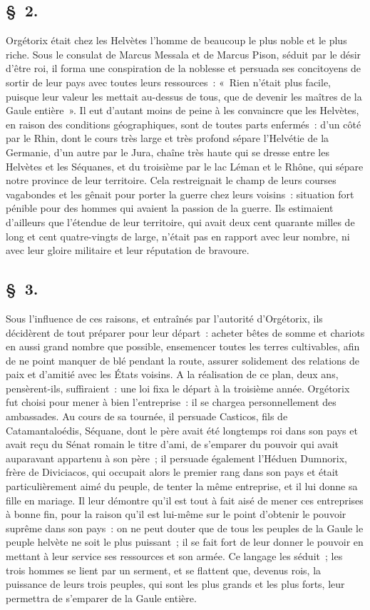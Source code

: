 \documentclass[french,twoside]{book} %
\begin{document}
\subsection[{§ 2.}]{ \textsc{§ 2.} }
\noindent Orgétorix était chez les Helvètes l’homme de beaucoup le plus noble et le plus riche. Sous le consulat de Marcus Messala et de Marcus Pison, séduit par le désir d’être roi, il forma une conspiration de la noblesse et persuada ses concitoyens de sortir de leur pays avec toutes leurs ressources : « Rien n’était plus facile, puisque leur valeur les mettait au-dessus de tous, que de devenir les maîtres de la Gaule entière ». Il eut d’autant moins de peine à les convaincre que les Helvètes, en raison des conditions géographiques, sont de toutes parts enfermés : d’un côté par le Rhin, dont le cours très large et très profond sépare l’Helvétie de la Germanie, d’un autre par le Jura, chaîne très haute qui se dresse entre les Helvètes et les Séquanes, et du troisième par le lac Léman et le Rhône, qui sépare notre province de leur territoire. Cela restreignait le champ de leurs courses vagabondes et les gênait pour porter la guerre chez leurs voisins : situation fort pénible pour des hommes qui avaient la passion de la guerre. Ils estimaient d’ailleurs que l’étendue de leur territoire, qui avait deux cent quarante milles de long et cent quatre-vingts de large, n’était pas en rapport avec leur nombre, ni avec leur gloire militaire et leur réputation de bravoure.
\subsection[{§ 3.}]{ \textsc{§ 3.} }
\noindent Sous l’influence de ces raisons, et entraînés par l’autorité d’Orgétorix, ils décidèrent de tout préparer pour leur départ : acheter bêtes de somme et chariots en aussi grand nombre que possible, ensemencer toutes les terres cultivables, afin de ne point manquer de blé pendant la route, assurer solidement des relations de paix et d’amitié avec les États voisins. A la réalisation de ce plan, deux ans, pensèrent-ils, suffiraient : une loi fixa le départ à la troisième année. Orgétorix fut choisi pour mener à bien l’entreprise : il se chargea personnellement des ambassades. Au cours de sa tournée, il persuade Casticos, fils de Catamantaloédis, Séquane, dont le père avait été longtemps roi dans son pays et avait reçu du Sénat romain le titre d’ami, de s’emparer du pouvoir qui avait auparavant appartenu à son père ; il persuade également l’Héduen Dumnorix, frère de Diviciacos, qui occupait alors le premier rang dans son pays et était particulièrement aimé du peuple, de tenter la même entreprise, et il lui donne sa fille en mariage. Il leur démontre qu’il est tout à fait aisé de mener ces entreprises à bonne fin, pour la raison qu’il est lui-même sur le point d’obtenir le pouvoir suprême dans son pays : on ne peut douter que de tous les peuples de la Gaule le peuple helvète ne soit le plus puissant ; il se fait fort de leur donner le pouvoir en mettant à leur service ses ressources et son armée. Ce langage les séduit ; les trois hommes se lient par un serment, et se flattent que, devenus rois, la puissance de leurs trois peuples, qui sont les plus grands et les plus forts, leur permettra de s’emparer de la Gaule entière.
\end{document}
